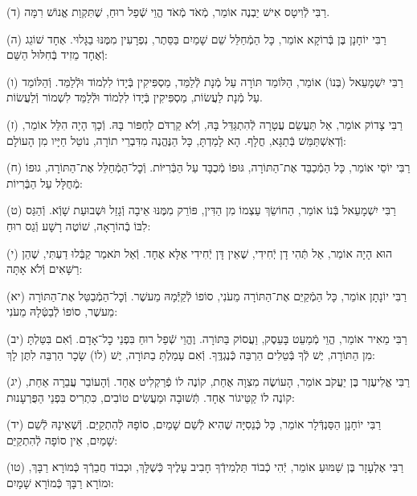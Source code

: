 \documentclass[twoside, openany, parskip=half, 11pt]{book}
\begin{document}
(ד)
רַבִּי לְֿוִיטָס אִישׁ יַבְנֶה אוֹמֵר, מְֿאֹד מְֿאֹד הֱוֵי שְֿׁפַל רוּחַ, שֶׁתִּקְוַת אֱנוֹשׁ רִמָּה.

(ה)
רַבִּי יוֹחָנָן בֶּן בְּֿרוֹקָא אוֹמֵר, כָּל הַמְֿחַלֵּל שֵׁם שָׁמַיִם בַּסֵּתֶר, נִפְרָעִין מִמֶּנּוּ בַגָּלוּי.
אֶחָד שׁוֹגֵג וְֿאֶחָד מֵזִיד בְּֿחִלּוּל הַשֵּׁם:

(ו)
רַבִּי יִשְׁמָעֵאל (בְּנוֹ) אוֹמֵר, הַלּוֹמֵד תּוֹרָה עַל מְֿנָת לְֿלַמֵּד, מַסְפִּיקִין בְּֿיָדוֹ לִלְמוֹד וּלְֿלַמֵּד.
וְֿהַלּוֹמֵד עַל מְֿנָת לַעֲשׂוֹת, מַסְפִּיקִין בְּֿיָדוֹ לִלְמוֹד וּלְֿלַמֵּד לִשְׁמוֹר וְֿלַעֲשׂוֹת.

(ז)
רַבִּי צָדוֹק אוֹמֵר, אַל תַּעֲשֵׂם עֲטָרָה לְֿהִתְגַּדֵּל בָּהּ, וְֿלֹא קַרְדֹּם לַחְפּוֹר בָּהּ.
וְֿכָךְ הָיָה הִלֵּל אוֹמֵר, וְֿדְאִשְׁתַּמֵּשׁ בְּֿתַגָּא, חֳלָף.
הָא לָמַדְתָּ, כָּל הַנֶּהֱנֶה מִדִּבְרֵי תוֹרָה, נוֹטֵל חַיָּיו מִן הָעוֹלָם:

(ח)
רַבִּי יוֹסֵי אוֹמֵר, כָּל הַמְֿכַבֵּד אֶת־הַתּוֹרָה, גּוּפוֹ מְֿכֻבָּד עַל הַבְּֿרִיּוֹת.
וְֿכׇל־הַמְֿחַלֵּל אֶת־הַתּוֹרָה, גוּפוֹ מְֿחֻלָּל עַל הַבְּֿרִיוֹת:

(ט)
רַבִּי יִשְׁמָעֵאל בְּֿנוֹ אוֹמֵר, הַחוֹשֵׂךְ עַצְמוֹ מִן הַדִּין, פּוֹרֵק מִמֶּנּוּ אֵיבָה וְֿגָזֵל וּשְׁבוּעַת שָׁוְֿא.
וְֿהַגַּס לִבּוֹ בְֿהוֹרָאָה, שׁוֹטֶה רָשָׁע וְֿגַס רוּחַ:

(י)
הוּא הָיָה אוֹמֵר, אַל תְּֿהִי דָן יְֿחִידִי, שֶׁאֵין דָּן יְֿחִידִי אֶלָּא אֶחָד.
וְֿאַל תֹּאמַר קַבְּֿלוּ דַעְתִּי, שֶׁהֵן רַשָּׁאִים וְֿלֹא אָתָּה:

(יא)
רַבִּי יוֹנָתָן אוֹמֵר, כָּל הַמְֿקַיֵּם אֶת־הַתּוֹרָה מֵעֹנִי, סוֹפוֹ לְֿקַיְּֿֿמָהּ מֵעשֶׁר.
וְֿכׇל־הַמְֿבַטֵּל אֶת־הַתּוֹרָה מֵעשֶׁר, סוֹפוֹ לְֿבַטְּֿלָהּ מֵעֹנִי:

(יב)
רַבִּי מֵאִיר אוֹמֵר, הֱוֵי מְֿמַעֵט בָּעֵסֶק, וַעֲסוֹק בַּתּוֹרָה.
וֶהֱוֵי שְֿׁפַל רוּחַ בִּפְנֵי כׇל־אָדָם.
וְֿאִם בִּטַּלְתָּ מִן הַתּוֹרָה, יֶשׁ לְֿךָ בְּֿטֵלִים הַרְבֵּה כְּֿנֶגְדֶּֽךָ.
וְֿאִם עָמַלְתָּ בַתּוֹרָה, יֶשׁ (לוֹ) שָׂכָר הַרְבֵּה לִתֶּן לָךְ:


(יג)
רַבִּי אֱלִיעֶזֶר בֶּן יַעֲקֹב אוֹמֵר, הָעוֹשֶׂה מִצִוָה אֶחַת, קוֹנֶה לוֹ פְֿרַקְלִיט אֶחָד.
וְֿהָעוֹבֵר עֲבֵרָה אַחַת, קוֹנֶה לוֹ קַטֵּיגוֹר אֶחָד.
תְּֿשׁוּבָה וּמַעֲשִׂים טוֹבִים, כִּתְרִיס בִּפְנֵי הַפֻּרְעָנוּת:

(יד)
רַבִּי יוֹחָנָן הַסַּנְדְּֿלָר אוֹמֵר, כָּל כְּֿנֵסִיָּה שֶׁהִיא לְֿשֵׁם שָׁמַיִם,
סוֹפָהּ לְֿהִתְקַיֵּם. וְֿשֶׁאֵינָהּ לְֿשֵׁם שָׁמַיִם, אֵין סוֹפָה לְֿהִתְקַיֵּם:


(טו)
רַבִּי אֶלְעָזָר בֶּן שַׁמּוּעַ אוֹמֵר, יְֿהִי כְֿבוֹד תַּלְמִידְֿךָ חָבִיב עָלֶיךָ כְּֿשֶׁלָּךְ,
וּכְבוֹד חֲבֵרְֿךָ כְּֿמוֹרָא רַבָּךְ,
וּמוֹרָא רַבָּךְ כְּֿמוֹרָא שָׁמָיִם:
\end{document}
